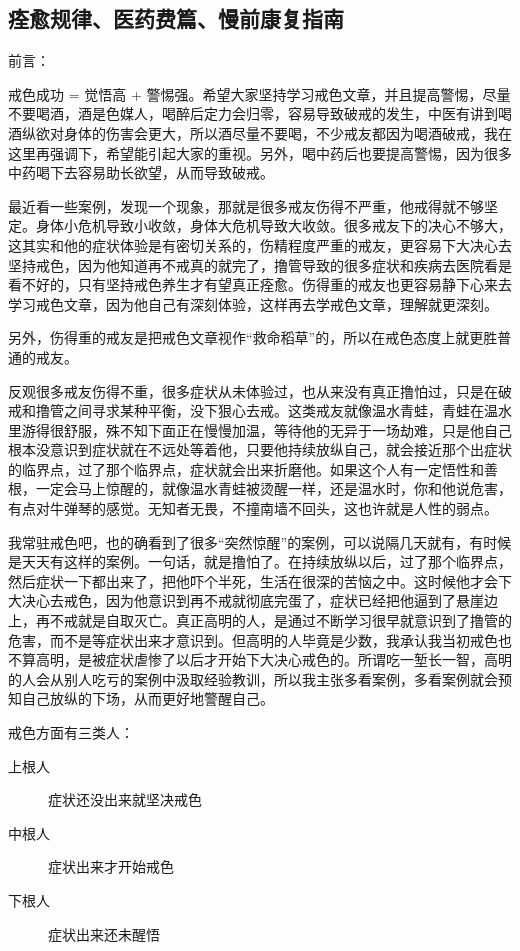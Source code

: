 \documentclass{ctexart}
\begin{document}
\subsection{痊愈规律、医药费篇、慢前康复指南}

前言：

戒色成功 = 觉悟高 + 警惕强。希望大家坚持学习戒色文章，并且提高警惕，尽量不要喝酒，酒是色媒人，喝醉后定力会归零，容易导致破戒的发生，中医有讲到喝酒纵欲对身体的伤害会更大，所以酒尽量不要喝，不少戒友都因为喝酒破戒，我在这里再强调下，希望能引起大家的重视。另外，喝中药后也要提高警惕，因为很多中药喝下去容易助长欲望，从而导致破戒。

最近看一些案例，发现一个现象，那就是很多戒友伤得不严重，他戒得就不够坚定。身体小危机导致小收敛，身体大危机导致大收敛。很多戒友下的决心不够大，这其实和他的症状体验是有密切关系的，伤精程度严重的戒友，更容易下大决心去坚持戒色，因为他知道再不戒真的就完了，撸管导致的很多症状和疾病去医院看是看不好的，只有坚持戒色养生才有望真正痊愈。伤得重的戒友也更容易静下心来去学习戒色文章，因为他自己有深刻体验，这样再去学戒色文章，理解就更深刻。

另外，伤得重的戒友是把戒色文章视作“救命稻草”的，所以在戒色态度上就更胜普通的戒友。

反观很多戒友伤得不重，很多症状从未体验过，也从来没有真正撸怕过，只是在破戒和撸管之间寻求某种平衡，没下狠心去戒。这类戒友就像温水青蛙，青蛙在温水里游得很舒服，殊不知下面正在慢慢加温，等待他的无异于一场劫难，只是他自己根本没意识到症状就在不远处等着他，只要他持续放纵自己，就会接近那个出症状的临界点，过了那个临界点，症状就会出来折磨他。如果这个人有一定悟性和善根，一定会马上惊醒的，就像温水青蛙被烫醒一样，还是温水时，你和他说危害，有点对牛弹琴的感觉。无知者无畏，不撞南墙不回头，这也许就是人性的弱点。

我常驻戒色吧，也的确看到了很多“突然惊醒”的案例，可以说隔几天就有，有时候是天天有这样的案例。一句话，就是撸怕了。在持续放纵以后，过了那个临界点，然后症状一下都出来了，把他吓个半死，生活在很深的苦恼之中。这时候他才会下大决心去戒色，因为他意识到再不戒就彻底完蛋了，症状已经把他逼到了悬崖边上，再不戒就是自取灭亡。真正高明的人，是通过不断学习很早就意识到了撸管的危害，而不是等症状出来才意识到。但高明的人毕竟是少数，我承认我当初戒色也不算高明，是被症状虐惨了以后才开始下大决心戒色的。所谓吃一堑长一智，高明的人会从别人吃亏的案例中汲取经验教训，所以我主张多看案例，多看案例就会预知自己放纵的下场，从而更好地警醒自己。

戒色方面有三类人：

\begin{description}
    \item[上根人] 症状还没出来就坚决戒色
    \item[中根人] 症状出来才开始戒色
    \item[下根人] 症状出来还未醒悟
\end{description}
\end{document}
